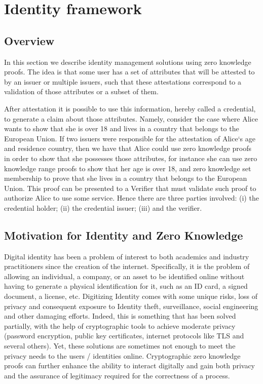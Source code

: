 \section{Identity framework}
\label{apps:id-framework}


\subsection{Overview}
\label{sec:apps:id-framework:overview}

In this section we describe identity management solutions using zero knowledge proofs.
The idea is that some user has a set of attributes that will be attested to by an issuer or multiple issuers, such that these attestations correspond to a validation of those attributes or a subset of them. 

After attestation it is possible to use this information, hereby called a credential, to generate a claim about those attributes.
Namely, consider the case where Alice wants to show that she is over 18 and lives in a country that belongs to the European Union.
If two issuers were responsible for the attestation of Alice`s age and residence country, then we have that Alice could use zero knowledge proofs in order to show that she possesses those attributes, for instance she can use zero knowledge range proofs to show that her age is over 18, and zero knowledge set membership to prove that she lives in a country that belongs to the European Union.
This proof can be presented to a Verifier that must validate such proof to authorize Alice to use some service.
Hence there are three parties involved: (i) the credential holder; (ii) the credential issuer; (iii) and the verifier.  


\subsection{Motivation for Identity and Zero Knowledge}
\label{sec:apps:id-framework:motivation}

Digital identity has been a problem of interest to both academics and industry practitioners since the creation of the internet.
Specifically, it is the problem of allowing an individual, a company, or an asset to be identified online without having to generate a physical identification for it, such as an ID card, a signed document, a license, etc.
Digitizing Identity comes with some unique risks, loss of privacy and consequent exposure to Identity theft, surveillance, social engineering and other damaging efforts.
Indeed, this is something that has been solved partially, with the help of cryptographic tools to achieve moderate privacy (password encryption, public key certificates, internet protocols like TLS and several others).
Yet, these solutions are sometimes not enough to meet the privacy needs to the users / identities online.
Cryptographic zero knowledge proofs can further enhance the ability to interact digitally and gain both privacy and the assurance of legitimacy required for the correctness of a process.
 
